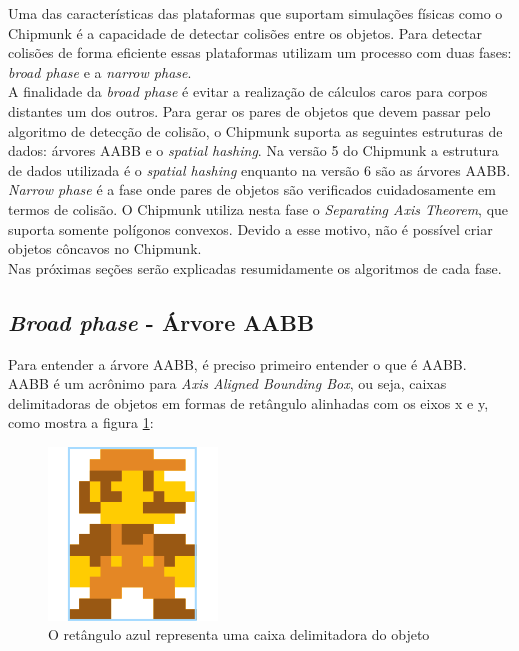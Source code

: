 Uma das características das plataformas que suportam simulações físicas como o Chipmunk é a capacidade de detectar colisões entre os objetos. 
Para detectar colisões de forma eficiente essas plataformas utilizam um processo com duas fases: \textit{broad phase} e a \textit{narrow phase}.\\

A finalidade da \textit{broad phase} é evitar a realização de cálculos caros para corpos distantes um dos outros. Para
gerar os pares de objetos que devem passar pelo algoritmo de detecção de colisão, o Chipmunk suporta as seguintes estruturas de dados:
árvores AABB e o \textit{spatial hashing}. Na versão 5 do Chipmunk a estrutura de dados utilizada é o \textit{spatial hashing} enquanto na versão 6 são as árvores AABB. \\

\textit{Narrow phase} é a fase onde pares de objetos são verificados cuidadosamente em termos de colisão. O Chipmunk utiliza nesta fase o \textit{Separating Axis Theorem}, que suporta somente polígonos convexos. Devido a esse motivo, não é possível criar objetos côncavos no Chipmunk. \\

Nas próximas seções serão explicadas resumidamente os algoritmos de cada fase.

\subsection{\textit{Broad phase} - Árvore AABB}

Para entender a árvore AABB, é preciso primeiro entender o que é AABB. AABB é um acrônimo para \textit{Axis Aligned Bounding Box}, ou seja, caixas delimitadoras de objetos 
em formas de retângulo alinhadas com os eixos x e y, como mostra a figura \ref{mariobb}:

\begin{figure}[!htbp]
  \centering
  \includegraphics[scale=0.3]{mario_bb.png} 
  \caption{O retângulo azul representa uma caixa delimitadora do objeto}
  \label{mariobb}
\end{figure}

